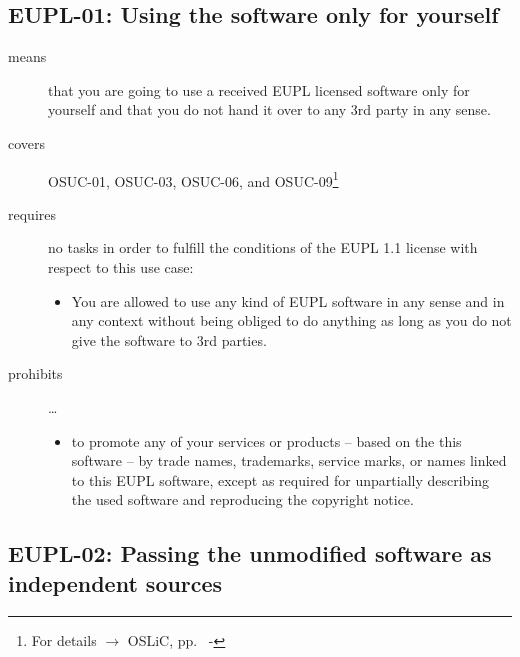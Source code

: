 \subsection{EUPL-01: Using the software only for yourself}
\label{OSUC-01-EUPL} \label{OSUC-03-EUPL} 
\label{OSUC-06-EUPL} \label{OSUC-09-EUPL}

\begin{description}

\item[means] that you are going to use a received EUPL licensed software only
for yourself and that you do not hand it over to any 3rd party in any sense.

\item[covers] OSUC-01, OSUC-03, OSUC-06, and OSUC-09\footnote{For details 
$\rightarrow$ OSLiC, pp.\ \pageref{OSUC-01-DEF} - \pageref{OSUC-09-DEF}}

\item[requires] no tasks in order to fulfill the conditions of the EUPL 1.1
license with respect to this use case:
  \begin{itemize}
    \item You are allowed to use any kind of EUPL software in any sense and in
    any context without being obliged to do anything as long as you do not
    give the software to 3rd parties.
  \end{itemize}
  
\item[prohibits] \ldots
\begin{itemize}
  \item to promote any of your services or products -- based on the this software
  -- by trade names, trademarks, service marks, or names linked to this EUPL
  software, except as required for unpartially describing the used software and
  reproducing the copyright notice.
\end{itemize}

\end{description}

\subsection{EUPL-02: Passing the unmodified software as independent sources}
\label{OSUC-02S-EUPL} \label{OSUC-05S-EUPL}

